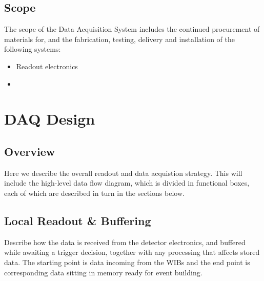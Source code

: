

\subsection{Scope}
\label{sec:fdsp-daq-scope}

The scope of the Data Acquisition System includes the continued procurement of materials for, and the fabrication, testing, delivery and installation of the following systems: 


\begin{itemize}
\item Readout electronics 
\item 
\end{itemize}


\newpage 

\section{DAQ Design}
\label{sec:fdsp-daq-design}


\subsection{Overview}
\label{sec:fdsp-daq-ltr}

Here we describe the overall readout and data acquistion strategy. This will include the high-level data flow diagram, which is divided in functional boxes, each of which are described in turn in the sections below.

\subsection{Local Readout \& Buffering}
\label{sec:fdsp-daq-ltr}

Describe how the data is received from the detector electronics, and buffered while awaiting a trigger decision, together with any processing that affects stored data.  The starting point is data incoming from the WIBs and the end point is corresponding data sitting in memory ready for event building. 

